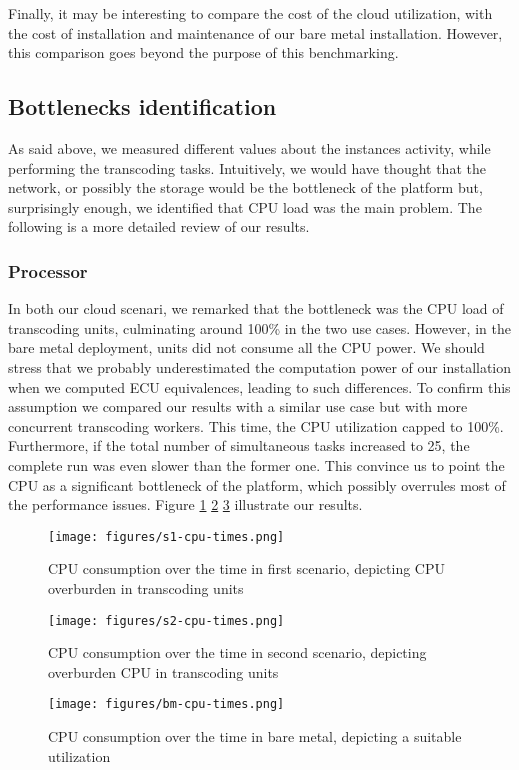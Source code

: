 \documentclass[a4paper, titlepage]{paper}
\numberwithin{figure}{section}
\numberwithin{table}{section}
\begin{document}
      Finally, it may be interesting to compare the cost of the cloud utilization, with the cost of installation and maintenance of our bare metal installation. However, this comparison goes beyond the purpose of this benchmarking.

    \subsection{Bottlenecks identification}
      As said above, we measured different values about the instances activity, while performing the transcoding tasks. Intuitively, we would have thought that the network, or possibly the storage would be the bottleneck of the platform but, surprisingly enough, we identified that CPU load was the main problem. The following is a more detailed review of our results.

      \subsubsection{Processor}
        In both our cloud scenari, we remarked that the bottleneck was the CPU load of transcoding units, culminating around 100\% in the two use cases. However, in the bare metal deployment, units did not consume all the CPU power. We should stress that we probably underestimated the computation power of our installation when we computed ECU equivalences, leading to such differences. To confirm this assumption we compared our results with a similar use case but with more concurrent transcoding workers. This time, the CPU utilization capped to 100\%. Furthermore, if the total number of simultaneous tasks increased to 25, the complete run was even slower than the former one. This convince us to point the CPU as a significant bottleneck of the platform, which possibly overrules most of the performance issues. Figure \ref{s1ct} \ref{s2ct} \ref{bmct} illustrate our results.
        
        \begin{figure}
          \centering
          \texttt{[image: figures/s1-cpu-times.png]}
          \caption{CPU consumption over the time in first scenario, depicting CPU overburden in transcoding units}
          \label{s1ct}
        \end{figure}
        \begin{figure}
          \centering
          \texttt{[image: figures/s2-cpu-times.png]}
          \caption{CPU consumption over the time in second scenario, depicting overburden CPU in transcoding units}
          \label{s2ct}
        \end{figure}
        \begin{figure}
          \centering
          \texttt{[image: figures/bm-cpu-times.png]}
          \caption{CPU consumption over the time in bare metal, depicting a suitable utilization}
          \label{bmct}
        \end{figure}
\end{document}
